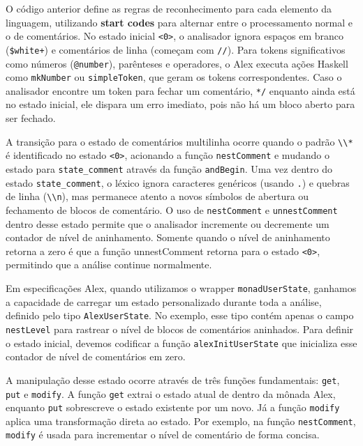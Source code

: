 O código anterior define as regras de reconhecimento para cada
elemento da linguagem, utilizando \textbf{start codes} para alternar
entre o processamento normal e o de comentários. No estado inicial
\verb|<0>|, o analisador ignora espaços em branco
(\verb|$white+|) e comentários de linha (começam
com \verb|//|). Para tokens significativos como
números (\verb|@number|), parênteses e operadores,
o Alex executa ações Haskell como \verb|mkNumber|
ou \verb|simpleToken|, que geram os tokens correspondentes. Caso o
analisador encontre um token para fechar um comentário,
\verb|*/| enquanto ainda está no estado inicial,
ele dispara um erro imediato, pois não há um bloco aberto para ser fechado.

A transição para o estado de comentários multilinha ocorre quando o
padrão \verb|\\*| é identificado no estado
\verb|<0>|, acionando a função
\verb|nestComment| e mudando o estado para
\verb|state_comment| através da função
\verb|andBegin|. Uma vez dentro do estado
\verb|state_comment|, o léxico ignora caracteres
genéricos (usando \verb|.|) e quebras de linha
(\verb|\\n|), mas permanece atento a novos
símbolos de abertura ou fechamento de blocos de comentário. O uso de
\verb|nestComment| e
\verb|unnestComment| dentro desse estado permite
que o analisador incremente ou decremente um contador de nível de
aninhamento. Somente quando o nível de aninhamento retorna a zero é
que a função unnestComment retorna para o estado
\verb|<0>|, permitindo que a análise continue normalmente.

Em especificações Alex, quando utilizamos o wrapper
\verb|monadUserState|, ganhamos a capacidade de
carregar um estado personalizado durante toda a análise, definido
pelo tipo \verb|AlexUserState|. No exemplo, esse
tipo contém apenas o campo \verb|nestLevel| para
rastrear o nível de blocos de comentários aninhados. Para definir o
estado inicial, devemos codificar a função
\verb|alexInitUserState| que inicializa esse
contador de nível de comentários em zero.

A manipulação desse estado ocorre através de três funções
fundamentais: \verb|get|,
\verb|put| e \verb|modify|. A
função \verb|get| extrai o estado atual de dentro
da mônada Alex, enquanto \verb|put| sobrescreve o
estado existente por um novo. Já a função
\verb|modify| aplica uma transformação direta ao
estado. Por exemplo, na função \verb|nestComment|,
\verb|modify| é usada para incrementar o nível de
comentário de forma concisa.


